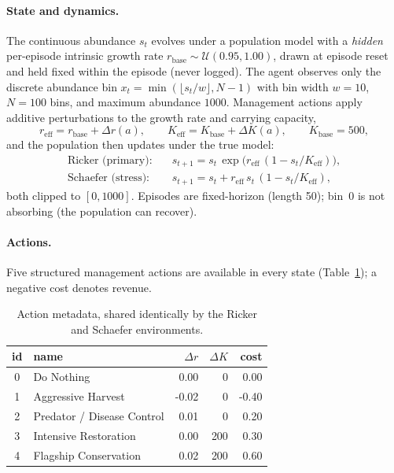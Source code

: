 \documentclass[11pt]{article}
\newcommand{\reff}{r_{\mathrm{eff}}}
\newcommand{\Keff}{K_{\mathrm{eff}}}
\newcommand{\rbase}{r_{\mathrm{base}}}
\begin{document}
\paragraph{State and dynamics.}
The continuous abundance $s_t$ evolves under a population model with a
\emph{hidden} per-episode intrinsic growth rate $\rbase \sim \mathcal{U}(0.95,
1.00)$, drawn at episode reset and held fixed within the episode (never logged).
The agent observes only the discrete abundance bin
$x_t = \min(\lfloor s_t / w \rfloor, N-1)$ with bin width $w = 10$, $N = 100$
bins, and maximum abundance $1000$. Management actions apply additive
perturbations to the growth rate and carrying capacity,
\begin{equation}
  \reff = \rbase + \Delta r(a), \qquad
  \Keff = K_{\mathrm{base}} + \Delta K(a), \qquad K_{\mathrm{base}} = 500,
\end{equation}
and the population then updates under the true model:
\begin{align}
  \text{Ricker (primary):}   \quad & s_{t+1} = s_t \, \exp\!\big(\reff\,(1 - s_t/\Keff)\big), \\
  \text{Schaefer (stress):}  \quad & s_{t+1} = s_t + \reff\, s_t\,(1 - s_t/\Keff),
\end{align}
both clipped to $[0, 1000]$. Episodes are fixed-horizon (length 50); bin~0 is not
absorbing (the population can recover).

\paragraph{Actions.}
Five structured management actions are available in every state
(Table~\ref{tab:actions}); a negative cost denotes revenue.

\begin{table}[h]
\centering
\small
\begin{tabular}{clrrr}
\toprule
id & name & $\Delta r$ & $\Delta K$ & cost \\
\midrule
0 & Do Nothing                 &  0.00 &   0 &  0.00 \\
1 & Aggressive Harvest         & -0.02 &   0 & -0.40 \\
2 & Predator / Disease Control &  0.01 &   0 &  0.20 \\
3 & Intensive Restoration      &  0.00 & 200 &  0.30 \\
4 & Flagship Conservation      &  0.02 & 200 &  0.60 \\
\bottomrule
\end{tabular}
\caption{Action metadata, shared identically by the Ricker and Schaefer
environments.}
\label{tab:actions}
\end{table}
\end{document}
